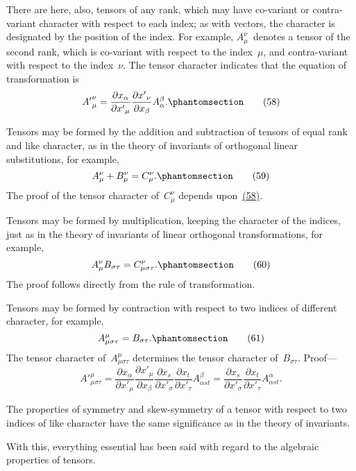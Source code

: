 \documentclass[12pt]{book}[2005/09/16]
\newcommand{\Change}[2]{#2}
\newcommand{\Add}[1]{\Change{}{#1}}
\newcommand{\PageSep}[1]{\ignorespaces}
\newcommand{\Tag}[1]{%
  \phantomsection
  \label{eqn:#1}
  \tag*{#1}
}
\newcommand{\Eqref}[1]{\hyperref[eqn:#1]{#1}}
\newcommand{\dd}{\partial}
\begin{document}
There are here, also, tensors of any rank, which may
have co-variant or contra-variant character with respect
to each index; as with vectors, the character is designated
by the position of the index. For example, $\Change{{A_{\mu}}^{\nu}}{A_{\mu}^{\nu}}$~denotes
a tensor of the second rank, which is co-variant
with respect to the index~$\mu$, and contra-variant with respect
to the index~$\nu$. The tensor character indicates
that the equation of transformation is
\[
\Change{A_{\mu}^{\nu'}}{{A'}_{\mu}^{\nu}}
  = \frac{\dd x_{\alpha}}{{\dd x'}_{\mu}}
    \frac{{\dd x'}_{\nu}}{\dd x_{\beta}} A_{\alpha}^{\beta}\Add{.}
\Tag{(58)}
\]

Tensors may be formed by the addition and subtraction
of tensors of equal rank and like character, as in the
theory of invariants of orthogonal linear substitutions, for
example,
\[
A_{\mu}^{\nu} + B_{\mu}^{\nu} = C_{\mu}^{\nu}\Add{.}
\Tag{(59)}
\]
The proof of the tensor character of~$C_{\mu}^{\nu}$ depends upon~\Eqref{(58)}.

Tensors may be formed by multiplication, keeping the
character of the indices, just as in the theory of invariants
of linear orthogonal transformations, for example,
\[
A_{\mu}^{\nu} B_{\sigma\tau} = C_{\mu\sigma\tau}^{\nu}\Add{.}
\Tag{(60)}
\]
\PageSep{74}
The proof follows directly from the rule of transformation.

Tensors may be formed by contraction with respect to
two indices of different character, for example,
\[
A_{\mu\sigma\tau}^{\mu} = B_{\sigma\tau}\Add{.}
\Tag{(61)}
\]
The tensor character of~$A_{\mu\sigma\tau}^{\mu}$ determines the tensor
character of~$B_{\sigma\tau}$. Proof---
\[
\Change{A_{\mu\sigma\tau}^{\mu'}}{{A'}_{\mu\sigma\tau}^{\mu}}
= \frac{\dd x_{\alpha}}{{\dd x'}_{\mu}} \frac{{\dd x'}_{\mu}}{\dd x_{\beta}}
  \frac{\dd x_{s}}{{\dd x'}_{\sigma}} \frac{\dd x_{t}}{{\dd x'}_{\tau}}
  \Change{}{A_{\alpha st}^{\beta}}
= \frac{\dd x_{s}}{{\dd x'}_{\sigma}} \frac{\dd x_{t}}{{\dd x'}_{\tau}}
  A_{\alpha st}^{\alpha}.
\]

The properties of symmetry and skew-symmetry of a
tensor with respect to two indices of like character have
the same significance as in the theory of invariants.

With this, everything essential has been said with
regard to the algebraic properties of tensors.
\end{document}
